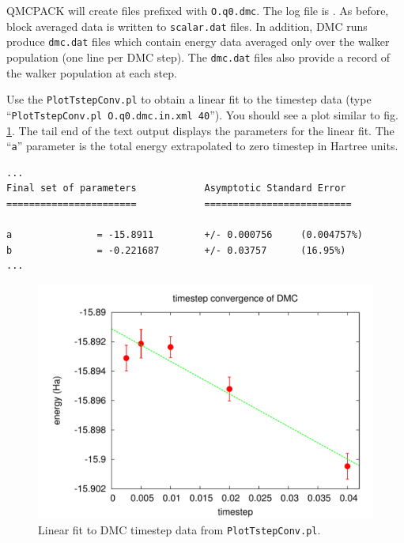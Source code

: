 QMCPACK will create files prefixed with \texttt{O.q0.dmc}.  The log file is .  As before, block averaged data is written to \texttt{scalar.dat} files.  In addition, DMC runs produce \texttt{dmc.dat} files which contain energy data averaged only over the walker population (one line per DMC step).  The \texttt{dmc.dat} files also provide a record of the walker population at each step.

Use the \texttt{PlotTstepConv.pl} to obtain a linear fit to the timestep data (type ``\texttt{PlotTstepConv.pl O.q0.dmc.in.xml 40}'').  You should see a plot similar to fig. \ref{fig:timestep_conv}.  The tail end of the text output displays the parameters for the linear fit.  The ``\texttt{a}'' parameter is the total energy extrapolated to zero timestep in Hartree units. 

\begin{shaded}
\begin{verbatim}
...
Final set of parameters            Asymptotic Standard Error
=======================            ==========================

a               = -15.8911         +/- 0.000756     (0.004757%)
b               = -0.221687        +/- 0.03757      (16.95%)
...
\end{verbatim}
\end{shaded}

\begin{figure}
\begin{center}
\includegraphics[trim = 0mm 0mm 0mm 0mm, clip,width=0.75\columnwidth]{./figures/lab_qmc_basics_timestep_conv}
\end{center}
\caption{Linear fit to DMC timestep data from \texttt{PlotTstepConv.pl}.
\label{fig:timestep_conv}
}
\end{figure}


